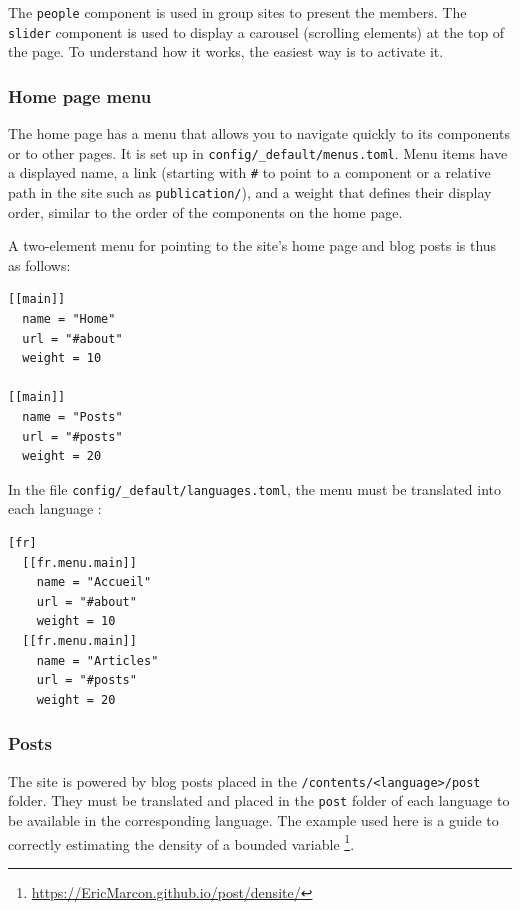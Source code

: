 \documentclass[
  12pt,
  american,
  a4paper,
  extrafontsizes,onecolumn,openright
  ]{memoir}
\begin{document}
The \texttt{people} component is used in group sites to present the members.
The \texttt{slider} component is used to display a carousel (scrolling elements) at the top of the page.
To understand how it works, the easiest way is to activate it.

\hypertarget{home-page-menu}{%
\subsubsection{Home page menu}\label{home-page-menu}}

The home page has a menu that allows you to navigate quickly to its components or to other pages.
It is set up in \texttt{config/\_default/menus.toml}.
Menu items have a displayed name, a link (starting with \texttt{\#} to point to a component or a relative path in the site such as \texttt{publication/}), and a weight that defines their display order, similar to the order of the components on the home page.

A two-element menu for pointing to the site's home page and blog posts is thus as follows:

\begin{verbatim}
[[main]]
  name = "Home"
  url = "#about"
  weight = 10

[[main]]
  name = "Posts"
  url = "#posts"
  weight = 20
\end{verbatim}

In the file \texttt{config/\_default/languages.toml}, the menu must be translated into each language :

\begin{verbatim}
[fr]
  [[fr.menu.main]]
    name = "Accueil"
    url = "#about"
    weight = 10
  [[fr.menu.main]]
    name = "Articles"
    url = "#posts"
    weight = 20
\end{verbatim}

\hypertarget{posts}{%
\subsubsection{Posts}\label{posts}}

The site is powered by blog posts placed in the \texttt{/contents/\textless{}language\textgreater{}/post} folder.
They must be translated and placed in the \texttt{post} folder of each language to be available in the corresponding language.
The example used here is a guide to correctly estimating the density of a bounded variable \footnote{\url{https://EricMarcon.github.io/post/densite/}}.
\end{document}
